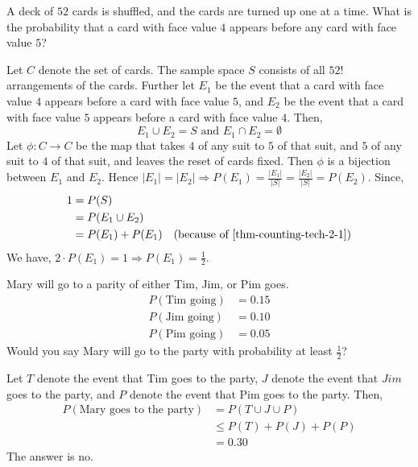 \begin{example}
    A deck of $52$ cards is shuffled, and the cards are turned up one at a
time. What is the probability that a card with face value $4$ appears before
any card with face value $5$?
\end{example}
\begin{solution}
    Let $C$ denote the set of cards. The sample space $S$ consists of all $52!$
arrangements of the cards. Further let $E_1$ be the event that a card with face
value $4$ appears before a card with face value $5$, and $E_2$ be the event
that a card with face value $5$ appears before a card with face value $4$.
Then, 
\begin{equation}
    \label{thm-counting-tech-2-1}
    E_1 \cup E_2 = S \text{ and } E_1 \cap E_2 = \emptyset
\end{equation}
Let $\phi : C \rightarrow C$ be the map that takes $4$ of any suit to $5$ of
that suit, and $5$ of any suit to $4$ of that suit, and leaves the reset of
cards fixed. Then $\phi$ is a bijection between $E_1$ and $E_2$. Hence $\vert
E_1 \vert = \vert E_2 \vert \Rightarrow P(E_1) = \frac{\vert E_1 \vert}{\vert
S \vert} = \frac{\vert E_2 \vert}{\vert S \vert} = P(E_2)$. Since,
\begin{align*}
    1 &= P(S)                                                                \\
      &= P(E_1 \cup E_2)                                                     \\
      &= P(E_1) + P(E_1)     &\text{(because of \ref{thm-counting-tech-2-1})}
\end{align*}
We have, $2 \cdot P(E_1) = 1 \Rightarrow P(E_1) = \frac{1}{2}$.
\end{solution}

\begin{example}
    Mary will go to a parity of either Tim, Jim, or Pim goes.
    \begin{align*}
        P(\text{Tim going}) &= 0.15                                          \\
        P(\text{Jim going}) &= 0.10                                          \\
        P(\text{Pim going}) &= 0.05
    \end{align*}
    Would you say Mary will go to the party with probability at least
    $\frac{1}{2}$?
\end{example}
\begin{solution}
    Let $T$ denote the event that Tim goes to the party, $J$ denote the event
that $Jim$ goes to the party, and $P$ denote the event that Pim goes to the
party. Then, 
\begin{align*}
    P(\text{Mary goes to the party}) &= P(T \cup J \cup P)                   \\
                                     &\leq P(T) + P(J) + P(P)                \\
                                     &= 0.30
\end{align*}
The answer is no.
\end{solution}

